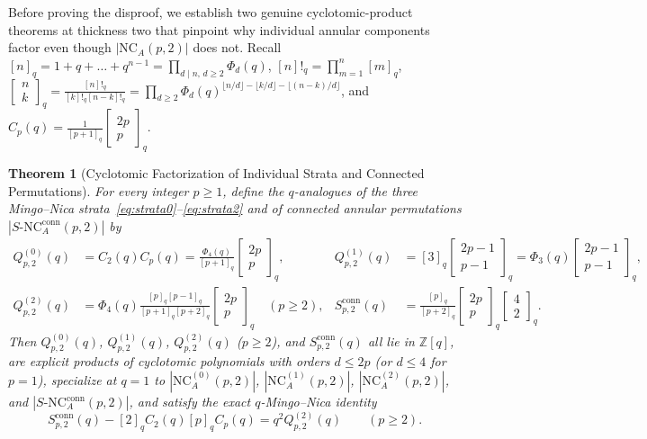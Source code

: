 \documentclass[11pt,a4paper]{article}
\newtheorem{theorem}{Theorem}[section]
\theoremstyle{definition}
\theoremstyle{remark}
\newcommand{\NCA}{\mathrm{NC}_A}
\newcommand{\SNCA}{S\text{-}\mathrm{NC}_A}
\newcommand{\qbinom}[2]{\begin{bmatrix} #1 \\ #2 \end{bmatrix}_q}
\begin{document}
Before proving the disproof, we establish two genuine cyclotomic-product theorems at thickness two that pinpoint why individual annular components factor even though $|\NCA(p,2)|$ does not. Recall $[n]_q = 1 + q + \dots + q^{n-1} = \prod_{d \mid n,\, d \ge 2} \Phi_d(q)$, $[n]!_q = \prod_{m=1}^n [m]_q$, $\qbinom{n}{k} = \frac{[n]!_q}{[k]!_q [n-k]!_q} = \prod_{d \ge 2} \Phi_d(q)^{\lfloor n/d \rfloor - \lfloor k/d \rfloor - \lfloor (n-k)/d \rfloor}$, and $C_p(q) = \frac{1}{[p+1]_q}\qbinom{2p}{p}$.

\begin{theorem}[Cyclotomic Factorization of Individual Strata and Connected Permutations]\label{thm:positive-strata}
For every integer $p \ge 1$, define the $q$-analogues of the three Mingo--Nica strata~\eqref{eq:strata0}--\eqref{eq:strata2} and of connected annular permutations $|\SNCA^{\mathrm{conn}}(p,2)|$ by
\begin{align*}
  Q^{(0)}_{p,2}(q) &= C_2(q) C_p(q) = \frac{\Phi_4(q)}{[p+1]_q}\qbinom{2p}{p}, &
  Q^{(1)}_{p,2}(q) &= [3]_q \qbinom{2p-1}{p-1} = \Phi_3(q)\qbinom{2p-1}{p-1},\\
  Q^{(2)}_{p,2}(q) &= \Phi_4(q)\frac{[p]_q [p-1]_q}{[p+1]_q [p+2]_q}\qbinom{2p}{p} \quad (p \ge 2), &
  S^{\mathrm{conn}}_{p,2}(q) &= \frac{[p]_q}{[p+2]_q}\qbinom{2p}{p}\qbinom{4}{2}.
\end{align*}
Then $Q^{(0)}_{p,2}(q)$, $Q^{(1)}_{p,2}(q)$, $Q^{(2)}_{p,2}(q)$ ($p \ge 2$), and $S^{\mathrm{conn}}_{p,2}(q)$ all lie in $\mathbb{Z}[q]$, are explicit products of cyclotomic polynomials with orders $d \le 2p$ (or $d \le 4$ for $p=1$), specialize at $q = 1$ to $|\NCA^{(0)}(p,2)|$, $|\NCA^{(1)}(p,2)|$, $|\NCA^{(2)}(p,2)|$, and $|\SNCA^{\mathrm{conn}}(p,2)|$, and satisfy the exact $q$-Mingo--Nica identity
\begin{equation}\label{eq:q-mingo-nica-identity}
  S^{\mathrm{conn}}_{p,2}(q) - [2]_q C_2(q) [p]_q C_p(q) = q^2 Q^{(2)}_{p,2}(q) \qquad (p \ge 2).
\end{equation}
\end{theorem}
\end{document}

